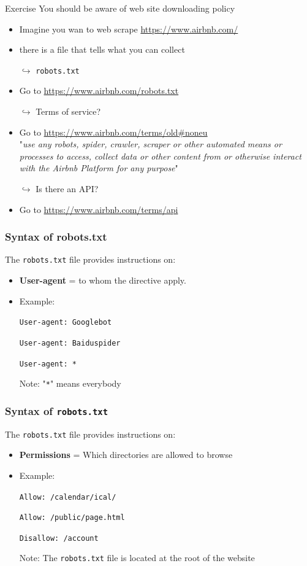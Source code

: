\documentclass[xcolor=x11names, aspectratio=169, compress]{beamer}
\renewcommand{\(}{\begin{columns}}
\renewcommand{\)}{\end{columns}}
\newcommand{\<}[1]{\begin{column}{#1}}
\renewcommand{\>}{\end{column}}
\begin{document}
\begin{frame}{Exercise}
You should be aware of  web site downloading policy
\pause
\begin{itemize}[<+->]
    \item Imagine you wan to web scrape \href{https://www.airbnb.com/}{https://www.airbnb.com/}
    \item there is a file that tells what you can collect
    \item[$\hookrightarrow$] \texttt{robots.txt}
    \item Go to \href{https://www.airbnb.com/robots.txt}{https://www.airbnb.com/robots.txt}
    \item[$\hookrightarrow$] Terms of service?
    \item Go to \url{https://www.airbnb.com/terms/old\#noneu} \\
    \footnotesize{"\emph{use any robots, spider, crawler, scraper or other automated means or processes to access, collect data or other content from or otherwise interact with the Airbnb Platform for any purpose}"}
     \item[$\hookrightarrow$] Is there an API?
    \item Go to \href{https://www.airbnb.com/terms/api}{https://www.airbnb.com/terms/api}

\end{itemize}
\end{frame}


\begin{frame}
    \frametitle{Syntax of robots.txt}
The \texttt{robots.txt} file provides instructions on:
    \begin{itemize}[<+->]
        \item \textbf{User-agent} = to whom the directive apply.
        \item Example:
        \item[] \texttt{User-agent: Googlebot }
        \item[] \texttt{User-agent: Baiduspider }
        \item[] \texttt{User-agent: *}

        \item[Note:] "\texttt{*}" means everybody

    \end{itemize}
\end{frame}


\begin{frame}
    \frametitle{Syntax of \texttt{robots.txt}}
The \texttt{robots.txt} file provides instructions on:
    \begin{itemize}[<+->]
        \item \textbf{Permissions} = Which directories are allowed to browse
        \item Example:
        \item[] \texttt{Allow: /calendar/ical/}
        \item[] \texttt{Allow: /public/page.html}
        \item[] \texttt{Disallow: /account}
        \item[Note:] The \texttt{robots.txt} file is located at the root of the website
    \end{itemize}
\end{frame}
\end{document}
